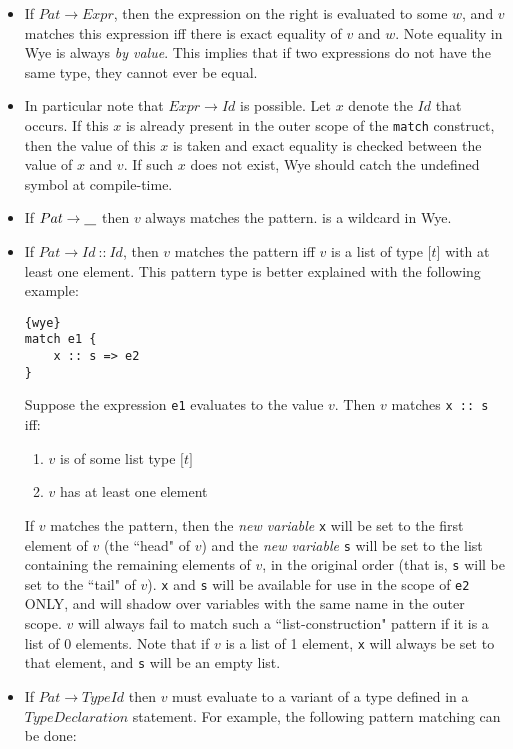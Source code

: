 \documentclass[a4paper, 12pt]{article}
\theoremstyle{myplain}
\theoremstyle{mydefinition}
\theoremstyle{myremark}
\numberwithin{equation} {section}
\numberwithin{figure}   {section}
\numberwithin{table}    {section}
\newcommand{\uscore}{\underline{\hspace{0.3cm}}}
\begin{document}
\begin{itemize}
\item If $Pat \to Expr$, then the expression on the right is evaluated to some $w$, and $v$ matches this expression iff there is exact equality of $v$ and $w$. Note equality in Wye is always \textit{by value}. This implies that if two expressions do not have the same type, they cannot ever be equal.
\item In particular note that $Expr \to Id$ is possible. Let $x$ denote the $Id$ that occurs. If this $x$ is already present in the outer scope of the \texttt{match} construct, then the value of this $x$ is taken and exact equality is checked between the value of $x$ and $v$. If such $x$ does not exist, Wye should catch the undefined symbol at compile-time.
\item If $Pat \to \uscore$ then $v$ always matches the pattern. \uscore{} is a wildcard in Wye.
\item If $Pat \to Id \:\texttt{::}\: Id$, then $v$ matches the pattern iff $v$ is a list of type $\texttt{[}t\texttt{]}$ with at least one element. This pattern type is better explained with the following example:
\begin{lstlisting}{wye}
match e1 {
	x :: s => e2
}
\end{lstlisting}
Suppose the expression \texttt{e1} evaluates to the value $v$. Then $v$ matches \texttt{x :: s} iff:
\begin{enumerate}
\item $v$ is of some list type $\texttt{[}t\texttt{]}$
\item $v$ has at least one element
\end{enumerate}
If $v$ matches the pattern, then the \textit{new variable} \texttt{x} will be set to the first element of $v$ (the ``head" of $v$) and the \textit{new variable} \texttt{s} will be set to the list containing the remaining elements of $v$, in the original order (that is, \texttt{s} will be set to the ``tail" of $v$). \texttt{x} and \texttt{s} will be available for use in the scope of \texttt{e2} ONLY, and will shadow over variables with the same name in the outer scope. $v$ will always fail to match such a ``list-construction" pattern if it is a list of 0 elements. Note that if $v$ is a list of 1 element, \texttt{x} will always be set to that element, and \texttt{s} will be an empty list.
\item If $Pat \to TypeId$ then $v$ must evaluate to a variant of a type defined in a $TypeDeclaration$ statement. For example, the following pattern matching can be done:

\end{itemize}
\end{document}
